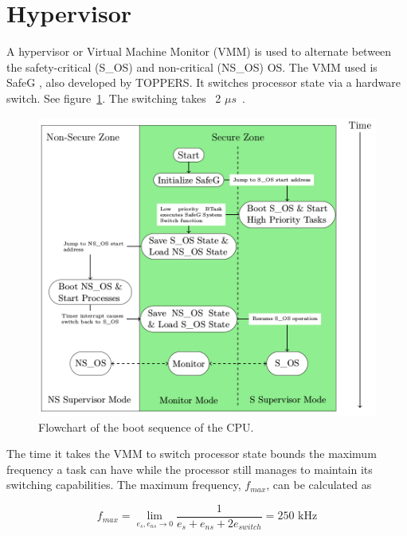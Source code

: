 \section{Hypervisor}

A hypervisor or Virtual Machine Monitor (VMM) is used to alternate between the safety-critical (S\_OS) and non-critical (NS\_OS) OS. The VMM used is SafeG \cite{website:safeg}, also developed by TOPPERS. It switches processor state via a hardware switch. See figure~\ref{fig:modeswitch}. The switching takes ~2 $\mu s$~\cite{safegswitch}.

\begin{figure}[H]
\centering
\includegraphics[width=\textwidth]{./img/literature_modeswitch.png}
\caption{Flowchart of the boot sequence of the CPU. \cite{zaki2016}}\label{fig:modeswitch}
\end{figure}

The time it takes the VMM to switch processor state bounds the maximum frequency a task can have while the processor still manages to maintain its switching capabilities. The maximum frequency, $f_{max}$, can be calculated as

$$f_{max} = \lim_{e_s, e_{ns} \to 0} \frac{1}{e_s+e_{ns}+2e_{switch}} = 250\textrm{ kHz}$$

